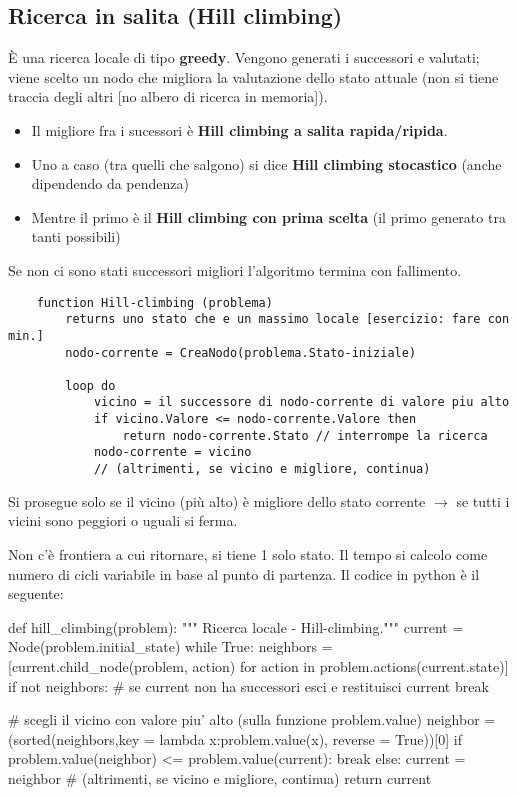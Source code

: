 \subsection{Ricerca in salita (Hill climbing)}
È una ricerca locale di tipo \textbf{greedy}. Vengono generati i successori e valutati; viene scelto un nodo che migliora la valutazione dello stato attuale (non si tiene traccia degli altri [no albero di ricerca in memoria]).
\begin{itemize}
    \item Il migliore fra i sucessori è \textbf{Hill climbing a salita rapida/ripida}.
    \item Uno a caso (tra quelli che salgono) si dice \textbf{Hill climbing stocastico} (anche dipendendo da pendenza)
    \item Mentre il primo è il \textbf{Hill climbing con prima scelta} (il primo generato tra tanti possibili)
\end{itemize}
Se non ci sono stati successori migliori l’algoritmo termina con fallimento.
\begin{lstlisting}
    function Hill-climbing (problema)
        returns uno stato che e un massimo locale [esercizio: fare con min.]
        nodo-corrente = CreaNodo(problema.Stato-iniziale)
        
        loop do   
            vicino = il successore di nodo-corrente di valore piu alto
            if vicino.Valore <= nodo-corrente.Valore then
                return nodo-corrente.Stato // interrompe la ricerca
            nodo-corrente = vicino
            // (altrimenti, se vicino e migliore, continua)
\end{lstlisting}
\begin{note}
    Si prosegue solo se il vicino (più alto) è migliore dello stato corrente $\to$ se tutti i vicini sono peggiori o uguali si ferma.
\end{note}
\hspace{-15pt}Non c'è frontiera a cui ritornare, si tiene 1 solo stato. Il tempo si calcolo come numero di cicli variabile in base al punto di partenza.
Il codice in python è il seguente:
\begin{python}
    def hill_climbing(problem): """ Ricerca locale - Hill-climbing."""
        current = Node(problem.initial_state)
        while True:
            neighbors = [current.child_node(problem, action) for action in
                        problem.actions(current.state)]
        if not neighbors: # se current non ha successori esci e restituisci current
            break

        # scegli il vicino con valore piu' alto (sulla funzione problem.value)
        neighbor = (sorted(neighbors,key = lambda x:problem.value(x), reverse = True))[0]
        if problem.value(neighbor) <= problem.value(current):
            break
        else:
            current = neighbor # (altrimenti, se vicino e migliore, continua)
        return current
\end{python}
